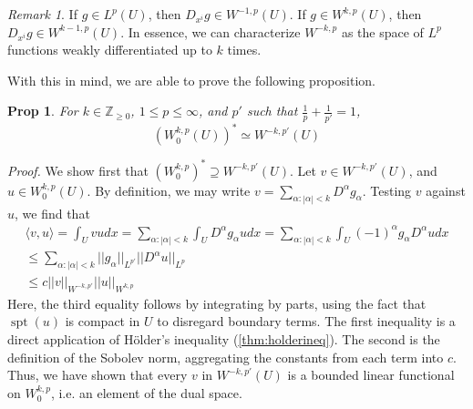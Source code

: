 \documentclass[letterpaper,10pt]{article}
\newcommand{\wkp}{W^{k,p}}
\DeclareMathOperator{\spt}{spt}
\theoremstyle{definition}
\theoremstyle{remark}
\newtheorem*{rmk}{Remark}
\theoremstyle{plain}
\newtheorem{prop}[thm]{Prop}
\renewenvironment{proof}{
    \vspace{5pt}
    \begin{mdframed}[bottomline=false,topline=false,rightline=false, skipabove=0]
    \noindent\textit{Proof.}}
{
    \hspace{\fill}\qedsymbol
    \end{mdframed}
}
\begin{document}
\begin{rmk}
    If $g\in L^p(U)$, then $D_{x^i}g\in W^{-1,p}(U)$.
    If $g\in\wkp(U)$, then $D_{x^i}g\in W^{k-1,p}(U)$.
    In essence, we can characterize $W^{-k,p}$ as the space of $L^p$ functions
    weakly differentiated up to $k$ times.
\end{rmk}
With this in mind, we are able to prove the following proposition.
\begin{prop}
    For $k\in\mathbb Z_{\geq 0}$, $1\leq p\leq\infty$, and $p'$ such that 
    $\frac{1}{p}+\frac{1}{p'}=1$,
    $$
    (\wkp_0(U))^*\simeq W^{-k,p'}(U)
    $$  
\end{prop}
\begin{proof} %
    We show first that $(\wkp_0)^*\supseteq W^{-k,p'}(U)$. 
    Let $v\in W^{-k,p'}(U)$, and $u\in\wkp_0(U)$.
    By definition, we may write $v=\sum_{\alpha:|\alpha|<k}^{}D^\alpha g_\alpha$.
    Testing $v$ against $u$, we find that 
    \begin{align*}
        \langle v,u\rangle=\int_{U}^{}vudx
        =\sum_{\alpha:|\alpha|<k}^{}\int_{U}^{}D^\alpha g_\alpha u dx
        =\sum_{\alpha:|\alpha|<k}^{}\int_{U}^{}(-1)^\alpha g_\alpha D^\alpha udx
        \\
        \leq\sum_{\alpha:|\alpha|<k}^{}||g_\alpha||_{L^{p'}}||D^\alpha u||_{L^p}
        \\
        \leq c||v||_{W^{-k,p'}}||u||_{\wkp} 
    \end{align*}
    Here, the third equality follows by integrating by parts, using the fact that 
    $\spt(u)$ is compact in $U$ to disregard boundary terms.
    The first inequality is a direct application of H\"older's inequality (\ref{thm:holderineq}).
    The second is the definition of the Sobolev norm, aggregating the 
    constants from each term into $c$.  
    Thus, we have shown that every $v$ in $W^{-k,p'}(U)$ is a bounded linear functional
    on $\wkp_0$, i.e. an element of the dual space.


\end{proof}
\end{document}

